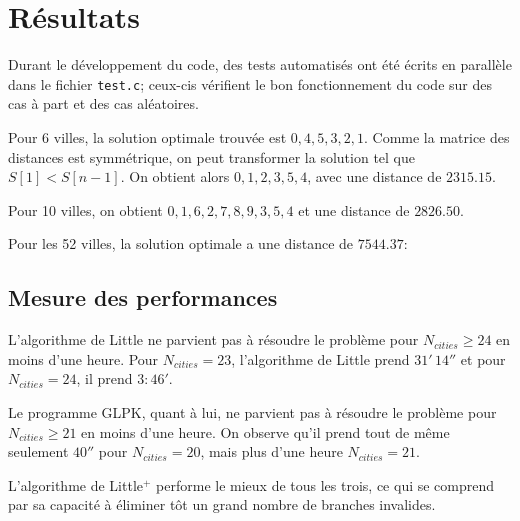 \documentclass[12pt]{article}
\begin{document}
\section{Résultats}

Durant le développement du code, des tests automatisés ont été écrits en parallèle dans le fichier \texttt{test.c}; ceux-cis vérifient le bon fonctionnement du code sur des cas à part et des cas aléatoires.

Pour 6 villes, la solution optimale trouvée est $0, 4, 5, 3, 2, 1$.
Comme la matrice des distances est symmétrique, on peut transformer la solution tel que $S[1] < S[n-1]$.
On obtient alors $0, 1, 2, 3, 5, 4$, avec une distance de $2315.15$.

Pour 10 villes, on obtient $0, 1, 6, 2, 7, 8, 9, 3, 5, 4$ et une distance de $2826.50$.

Pour les 52 villes, la solution optimale a une distance de $7544.37$:



\subsection{Mesure des performances}

L'algorithme de Little ne parvient pas à résoudre le problème pour $N_{cities} \geq 24$ en moins d'une heure.
Pour $N_{cities} = 23$, l'algorithme de Little prend $31'\,14''$ et pour $N_{cities} = 24$, il prend $3:46'$.

Le programme GLPK, quant à lui, ne parvient pas à résoudre le problème pour $N_{cities} \geq 21$ en moins d'une heure.
On observe qu'il prend tout de même seulement $40''$ pour $N_{cities} = 20$, mais plus d'une heure $N_{cities} = 21$.

L'algorithme de Little$^{+}$ performe le mieux de tous les trois, ce qui se comprend par sa capacité à éliminer tôt un grand nombre de branches invalides.
\end{document}
